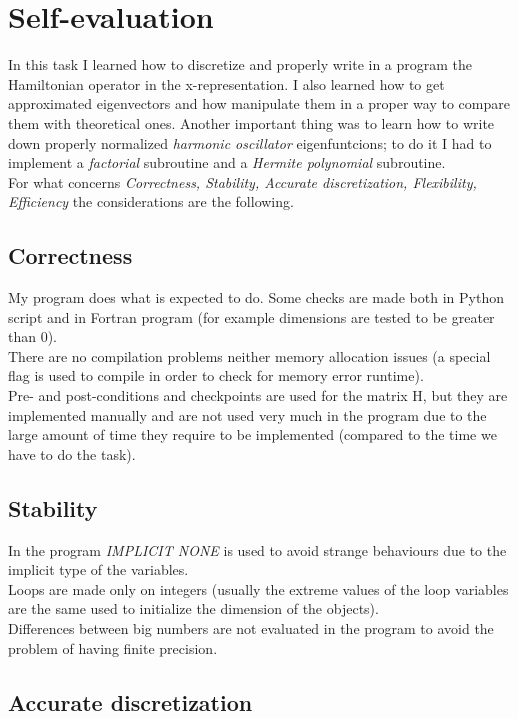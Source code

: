 \documentclass[12pt, a4paper, notitlepage]{report}
\begin{document}
\section*{Self-evaluation}
In this task I learned how to discretize and properly write in a program the Hamiltonian operator in the x-representation. I also learned how to get approximated eigenvectors and how manipulate them in a proper way to compare them with theoretical ones. Another important thing was to learn how to write down properly normalized \textit{harmonic oscillator} eigenfuntcions; to do it I had to implement a \textit{factorial} subroutine and a \textit{Hermite polynomial} subroutine.\\
For what concerns \textit{Correctness, Stability, Accurate discretization, Flexibility, Efficiency} the considerations are the following.\\

\subsection*{Correctness}

My program does what is expected to do. Some checks are made both in Python script and in Fortran program (for example dimensions are tested to be greater than 0).\\
There are no compilation problems neither memory allocation issues (a special flag is used to compile in order to check for memory error runtime).\\
Pre- and post-conditions and checkpoints are used for the matrix H, but they are implemented manually and are not used very much in the program due to the large amount of time they require to be implemented (compared to the time we have to do the task).


\subsection*{Stability}

In the program \textit{IMPLICIT NONE} is used to avoid strange behaviours due to the implicit type of the variables.\\
Loops are made only on integers (usually the extreme values of the loop variables are the same used to initialize the dimension of the objects).\\
Differences between big numbers are not evaluated in the program to avoid the problem of having finite precision.

\subsection*{Accurate discretization}
\end{document}
